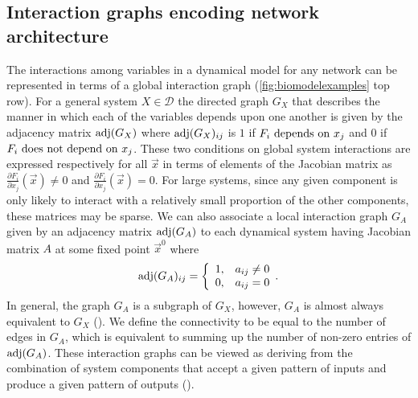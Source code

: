 \subsection{Interaction graphs encoding network architecture}
The interactions among variables in a dynamical model for any network can be represented in terms of a global interaction graph (\ref{fig:biomodelexamples} top row).
For a general system $X \in \mathcal{D}$ the directed graph $G_X$ that describes the manner in which each of the variables depends upon one another is given by the adjacency matrix $\mathrm{adj}(G_X)$ where $\mathrm{adj}(G_X)_{ij}$ is $1$ if $F_i \hbox{ depends on } x_j$ and $0$ if $F_i \hbox{ does not depend on } x_j$. These two conditions on global system interactions are expressed respectively for all $\vec{x}$ in terms of elements of the Jacobian matrix as $\frac{\partial F_i}{\partial x_j}(\vec{x}) \neq 0$ and $\frac{\partial F_i}{\partial x_j}(\vec{x}) = 0$.
For large systems, since any given component is only likely to interact with a relatively small proportion of the other components, these matrices may be sparse.
We can also associate a local interaction graph $G_A$ given by an adjacency matrix $\mathrm{adj}(G_A)$ to each dynamical system having Jacobian matrix $A$ at some fixed point $\vec{x}^0$ where
 \begin{equation}\label{eq:lininterdepadj}
   \mathrm{adj}(G_A)_{ij} = \left\{
     \begin{array}{lr}
       1, & a_{ij} \neq 0\\
       0, & a_{ij} = 0
     \end{array}.
   \right.
\end{equation}
In general, the graph $G_A$ is a subgraph of $G_X$, however, $G_A$ is almost always equivalent to $G_X$ (). We define the connectivity to be equal to the number of edges in $G_A$, which is equivalent to summing up the number of non-zero entries of $\mathrm{adj}(G_A)$.
These interaction graphs can be viewed as deriving from the combination of system components that accept a given pattern of inputs and produce a given pattern of outputs ().

